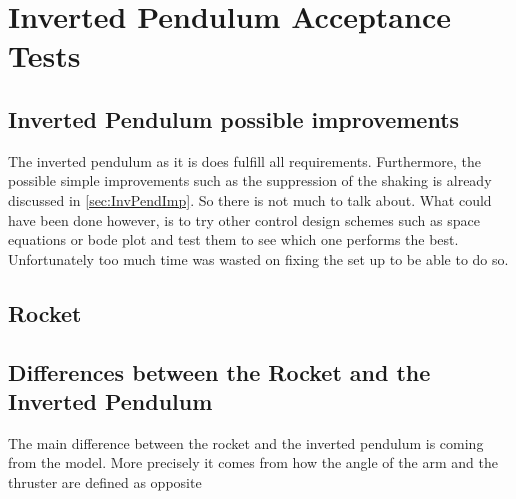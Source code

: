 \chapter{Inverted Pendulum Acceptance Tests}\label{sec:Discussion}

\section{Inverted Pendulum possible improvements}

The inverted pendulum as it is does fulfill all requirements. Furthermore, the possible simple improvements such as the suppression of the shaking is already discussed in \autoref{sec:InvPendImp}. So there is not much to talk about. What could have been done however, is to try other control design schemes such as space equations or bode plot and test them to see which one performs the best. Unfortunately too much time was wasted on fixing the set up to be able to do so.

\section{Rocket}



\section{Differences between the Rocket and the Inverted Pendulum}

The main difference between the rocket and the inverted pendulum is coming from the model. More precisely it comes from how the angle of the arm and the thruster are defined as opposite